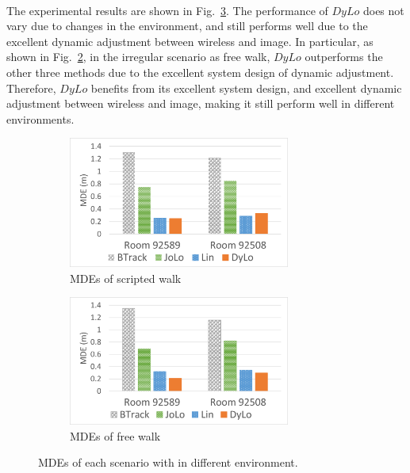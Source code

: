 \documentclass[a4paper,12pt]{report}
\begin{document}
\paragraph{}
The experimental results are shown in Fig.~\ref{figure:5_4_Different_Environment_MDE}. The performance of $DyLo$ does not vary due to changes in the environment, and still performs well due to the excellent dynamic adjustment between wireless and image. In particular, as shown in Fig.~\ref{figure:5_4_Different_Environment_MDE_FW}, in the irregular scenario as free walk, $DyLo$ outperforms the other three methods due to the excellent system design of dynamic adjustment. Therefore, $DyLo$ benefits from its excellent system design, and excellent dynamic adjustment between wireless and image, making it still perform well in different environments.
%

\begin{figure}[tbph]%
    \begin{subfigure}{1\linewidth}
    \centering
        \includegraphics[width=0.8\textwidth]{images/5_4_Different_Environment_MDE_SW.png}
        \caption{MDEs of scripted walk}
        \label{figure:5_4_Different_Environment_MDE_SW}
    \end{subfigure}
    \begin{subfigure}{1\linewidth}
    \centering
        \includegraphics[width=0.8\textwidth]{images/5_4_Different_Environment_MDE_FW.png}
        \caption{MDEs of free walk}
        \label{figure:5_4_Different_Environment_MDE_FW}
    \end{subfigure}
\caption{MDEs of each scenario with in different environment.}
\label{figure:5_4_Different_Environment_MDE}
\end{figure}
\end{document}
